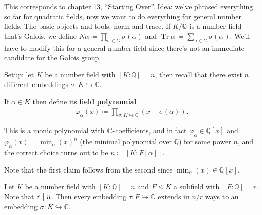 \begin{remark}

This corresponds to chapter 13, ``Starting Over''. Idea: we've phrased
everything so far for quadratic fields, now we want to do everything for
general number fields. The basic objects and tools: norm and trace. If
\(K/{\mathbb{Q}}\) is a number field that's Galois, we define
\(N \alpha \coloneqq\prod_{ \sigma \in G} \sigma( \alpha)\) and
\(\operatorname{Tr}\alpha \coloneqq\sum_{ \sigma\in G } \sigma( \alpha)\).
We'll have to modify this for a general number field since there's not
an immediate candidate for the Galois group.

Setup: let \(K\) be a number field with \([K: {\mathbb{Q}}] = n\), then
recall that there exist \(n\) different embeddings
\(\sigma: K \hookrightarrow{\mathbb{C}}\).

\end{remark}

\begin{definition}

If \(\alpha\in K\) then define its \textbf{field polynomial}
\begin{align*}
\varphi_{ \alpha}(x) \coloneqq\prod_{\sigma: K\hookrightarrow{\mathbb{C}}} (x - \sigma( \alpha) )
.\end{align*}

\end{definition}

\begin{proposition}

This is a monic polynomial with \({\mathbb{C}}{\hbox{-}}\)coefficients,
and in fact \(\varphi_{ \alpha} \in {\mathbb{Q}}[x]\) and
\(\varphi_{ \alpha}(x) = \min_{ \alpha} (x)^n\) (the minimal polynomial
over \({\mathbb{Q}}\)) for some power \(n\), and the correct choice
turns out to be \(n \coloneqq[K: F[ \alpha] ]\).

\end{proposition}

\begin{remark}

Note that the first claim follows from the second since
\(\min_{ \alpha}(x) \in {\mathbb{Q}}[x]\).

\end{remark}

\begin{lemma}

Let \(K\) be a number field with \([K: {\mathbb{Q}}] = n\) and
\(F\leq K\) a subfield with \([F: {\mathbb{Q}}] = r\). Note that
\(r\bigm|n\). Then every embedding
\(\tau: F\hookrightarrow{\mathbb{C}}\) extends in \(n/r\) ways to an
embedding \(\sigma: K \hookrightarrow{\mathbb{C}}\).

\end{lemma}

